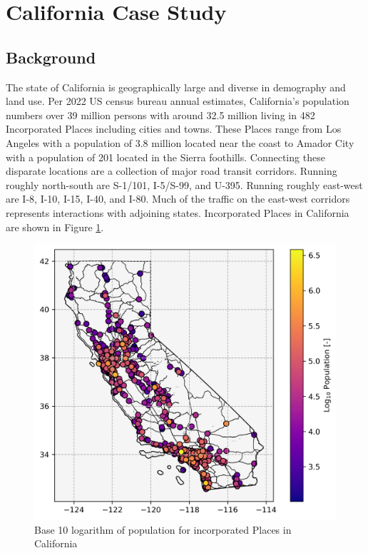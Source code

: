 \section*{California Case Study}

\subsection*{Background}

The state of California is geographically large and diverse in demography and land use. Per 2022 US census bureau annual estimates, California's population numbers over 39 million persons with around 32.5 million living in 482 Incorporated Places including cities and towns. These Places range from Los Angeles with a population of 3.8 million located near the coast to Amador City with a population of 201 located in the Sierra foothills. Connecting these disparate locations are a collection of major road transit corridors. Running roughly north-south are S-1/101, I-5/S-99, and U-395. Running roughly east-west are I-8, I-10, I-15, I-40, and I-80. Much of the traffic on the east-west corridors represents interactions with adjoining states. Incorporated Places in California are shown in Figure \ref{fig:california_incorporated_places}.

\begin{figure}[H]
	\centering
	\includegraphics[width = \linewidth]{figs/california_incorporated_places.png}
	\caption{Base 10 logarithm of population for incorporated Places in California}
	\label{fig:california_incorporated_places}
\end{figure}

